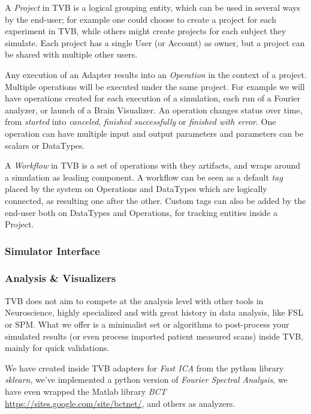 A \emph{Project} in TVB is a logical grouping entity, which  can be used in several ways by the end-user; 
for example one could choose to create a project for each experiment in TVB, while others might create projects for each subject they simulate.
Each project has a single User (or Account) as owner, but a project can be shared with multiple other users.

Any execution of an Adapter results into an \emph{Operation} in the context of a project. Multiple operations will be executed under the same project.
For example we will have operations created for each execution of a simulation, each run of a Fourier analyzer, or launch of a Brain Visualizer.
An operation changes status over time, from \emph{started} into \emph{canceled}, \emph{finished successfully} or \emph{finished with error}.
One operation can have multiple input and output parameters and parameters can be scalars or DataTypes.

A \emph{Workflow} in TVB is a set of operations with they artifacts, and wraps around a simulation as leading component.
A workflow can be seen as a default \emph{tag} placed by the system on Operations and DataTypes 
which are logically connected, as resulting one after the other.
Custom tags can also be added by the end-user both on DataTypes and Operations, for tracking entities inside a Project.

	\subsubsection{Simulator Interface}
	
	
	\subsubsection{Analysis \& Visualizers}

TVB does not aim to compete at the analysis level with other tools in Neuroscience, 
highly specialized and with great history in data analysis, like  FSL or SPM. 
What we offer is a minimalist set or algorithms to post-process your 
simulated results (or even process imported patient measured scans) inside TVB, mainly for quick validations.

We have created inside TVB adapters for \emph{Fast ICA} from the python library \emph{sklearn}, 
we've implemented a python version of \emph{Fourier Spectral Analysis}, 
we have even wrapped the Matlab library \emph{BCT} \url{https://sites.google.com/site/bctnet/}, and others as analyzers.

